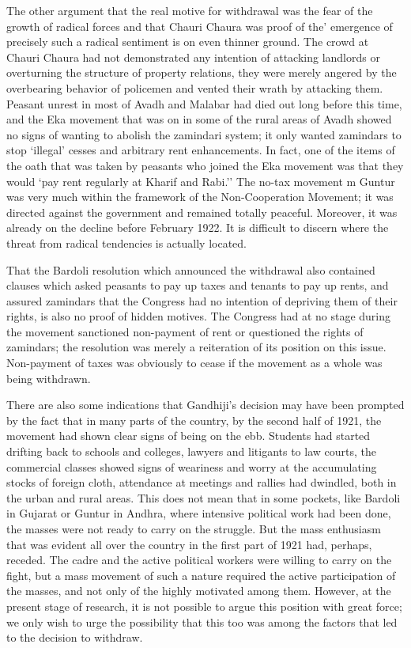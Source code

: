 \begin{multicols}{2}
The other argument that the real motive for withdrawal was the fear of the growth of radical forces and that Chauri Chaura was proof of the' emergence of precisely such a radical sentiment is on even thinner ground. The crowd at Chauri Chaura had not demonstrated any intention of attacking landlords or overturning the structure of property relations, they were merely angered by the overbearing behavior of policemen and vented their wrath by attacking them. Peasant unrest in most of Avadh and Malabar had died out long before this time, and the Eka movement that was on in some of the rural areas of Avadh showed no signs of wanting to abolish the zamindari system; it only wanted zamindars to stop `illegal' cesses and arbitrary rent enhancements. In fact, one of the items of the oath that was taken by peasants who joined the Eka movement was that they would `pay rent regularly at Kharif and Rabi.'' The no-tax movement m Guntur was very much within the framework of the Non-Cooperation Movement; it was directed against the government and remained totally peaceful. Moreover, it was already on the decline before February 1922. It is difficult to discern where the threat from radical tendencies is actually located. 

That the Bardoli resolution which announced the withdrawal also contained clauses which asked peasants to pay up taxes and tenants to pay up rents, and assured zamindars that the Congress had no intention of depriving them of their rights, is also no proof of hidden motives. The Congress had at no stage during the movement sanctioned non-payment of rent or questioned the rights of zamindars; the resolution was merely a reiteration of its position on this issue. Non-payment of taxes was obviously to cease if the movement as a whole was being withdrawn. 

There are also some indications that Gandhiji's decision may have been prompted by the fact that in many parts of the country, by the second half of 1921, the movement had shown clear signs of being on the ebb. Students had started drifting back to schools and colleges, lawyers and litigants to law courts, the commercial classes showed signs of weariness and worry at the accumulating stocks of foreign cloth, attendance at meetings and rallies had dwindled, both in the urban and rural areas. This does not mean that in some pockets, like Bardoli in Gujarat or Guntur in Andhra, where intensive political work had been done, the masses were not ready to carry on the struggle. But the mass enthusiasm that was evident all over the country in the first part of 1921 had, perhaps, receded. The cadre and the active political workers were willing to carry on the fight, but a mass movement of such a nature required the active participation of the masses, and not only of the highly motivated among them. However, at the present stage of research, it is not possible to argue this position with great force; we only wish to urge the possibility that this too was among the factors that led to the decision to withdraw. 


\end{multicols}
